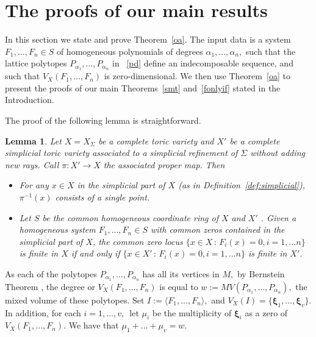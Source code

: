 \documentclass[a4paper,11pt]{amsart}
\newcommand{\bfxi}{{\boldsymbol{\xi}}}
\newcounter{thm}
\numberwithin{thm}{section}
\numberwithin{equation}{section}
\theoremstyle{definition}
\theoremstyle{plain}
\newtheorem{lemma}[thm]{Lemma}
\begin{document}
\section{The proofs of our main results}\label{sec:proofs}
In this section we state and prove Theorem~\ref{oa}. The input data is a system $F_1,\ldots, F_n\in S$ of homogeneous polynomials of degrees $\alpha_1,\ldots, \alpha_n,$ such that the lattice polytopes $P_{\alpha_1},\ldots, P_{\alpha_n}$ in ~\eqref{pd} define an indecomposable sequence, and such that  $V_X(F_1,\ldots, F_n)$   is zero-dimensional.
We then use Theorem~\ref{oa} to present the proofs of our main Theorems~\ref{smt} and~\ref{fonlyif} stated in the Introduction.


The proof of the following lemma is straightforward.

\begin{lemma}\label{tec}
Let $X= X_\Sigma$ be a complete toric variety and $X'$ be a complete simplicial toric variety associated to a simplicial refinement of $\Sigma$ without adding new rays. Call $\pi: X'\to X$ the associated proper map.
Then
\begin{itemize}
\item For any $x \in X$ in the simplicial part of $X$ (as in Definition~\ref{def:simplicial}),   $\pi^{-1}(x)$ consists of a single point.
\item 
Let $S$ be the common homogeneous coordinate ring of $X$ and $X'$ . Given
 a homogeneous system $F_1,\ldots, F_n\in S$ with common zeros  contained in the simplicial part of $X$,  the common zero locus $\{ x \in X \, : \, F_i(x)=0, i=1, \dots n \}$ is finite in $X$ if and only if $\{ x \in X' \, : \, F_i(x)=0, i=1, \dots n \}$ is finite in $X'$.
 \end{itemize} 
\end{lemma}

As each of the polytopes $P_{\alpha_1},\ldots, P_{\alpha_n}$  has all its vertices in $M,$  by Bernstein Theorem \cite{ber75}, the degree or $V_X(F_1,\ldots, F_n)$  is equal to  $w:=MV(P_{\alpha_1},\ldots, P_{\alpha_n}),$ the mixed volume of these polytopes. 
Set $I:=\langle F_1,\ldots, F_n\rangle,$ and $V_X(I)=\{\bfxi_1,\ldots, \bfxi_v\}.$ In addition, for each $i=1,\ldots, v,\,$ let $\mu_i$ be the multiplicity of $\bfxi_{i}$ as a zero of $V_X(F_1,\ldots, F_n).$ We have that $\mu_1+\ldots+\mu_v=w.$ 
\end{document}
